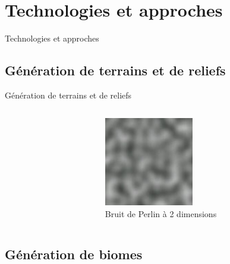 \documentclass[aspectratio=169]{beamer}
\begin{document}
\section{Technologies et approches}

\begin{frame}{Technologies et approches}
    \tableofcontents[sections={2}]
\end{frame}

\subsection{Génération de terrains et de reliefs}

\begin{frame}{Génération de terrains et de reliefs}
    \begin{columns}
        \centering
        \begin{column}{0.5\textwidth}
            \centering
            \lipsum[1][1-5]
        \end{column}
        \begin{column}{0.5\textwidth}
            \centering
            \begin{figure}
                \centering
                \captionsetup{format=sanslabel}
                \includegraphics[width=0.5\textwidth]{assets/Perlin_noise.jpg}
                \caption{Bruit de Perlin à 2 dimensions}
            \end{figure}
        \end{column}
    \end{columns}
\end{frame}

\subsection{Génération de biomes}
\end{document}
